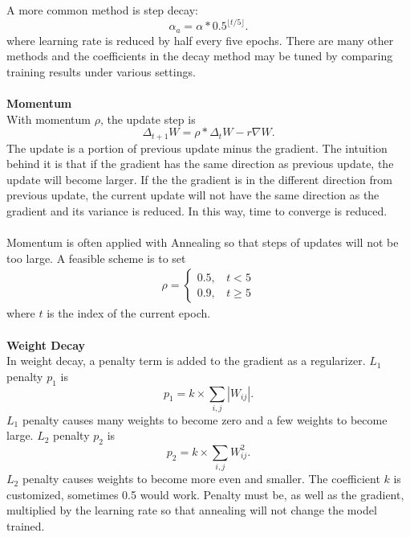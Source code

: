 \documentclass[12pt]{article}
\begin{document}
A more common method is step decay:\begin{equation}
\alpha_a = \alpha * 0.5^{\lfloor{t / 5}\rfloor{}}.
\end{equation}
where learning rate is reduced by half every five epochs. There are many other methods and the coefficients in the decay method may be tuned by comparing training results under various settings.\\
\\
\textbf{Momentum}\\
With momentum $\rho$, the update step is \begin{equation}
\Delta_{t+1} W = \rho * \Delta_t W - r\nabla W.
\end{equation}
The update is a portion of previous update minus the gradient. The intuition behind it is that if the gradient has the same direction as previous update, the update will become larger. If the the gradient is in the different direction from previous update, the current update will not have the same direction as the gradient and its variance is reduced. In this way, time to converge is reduced.\\
\\
Momentum is often applied with Annealing so that steps of updates will not be too large. A feasible scheme is to set \begin{eqnarray}
\rho=\begin{cases}
0.5,~~~~t <  5\\
0.9,~~~~t \geq 5
\end{cases}
\end{eqnarray}
where $t$ is the index of the current epoch.\\
\\
\textbf{Weight Decay}\\
In weight decay, a penalty term is added to the gradient as a regularizer. $L_1$ penalty $p_1$ is \begin{equation}
p_1 = k \times \sum_{i,j} |W_{ij}|.
\end{equation}
$L_1$ penalty causes many weights to become zero and a few weights to become large. $L_2$ penalty $p_2$ is \begin{equation}
p_2 = k \times \sum_{i,j} W_{ij}^2.
\end{equation}
$L_2$ penalty causes weights to become more even and smaller. The coefficient $k$ is customized, sometimes 0.5 would work. Penalty must be, as well as the gradient, multiplied by the learning rate so that annealing will not change the model trained. 
\end{document}
